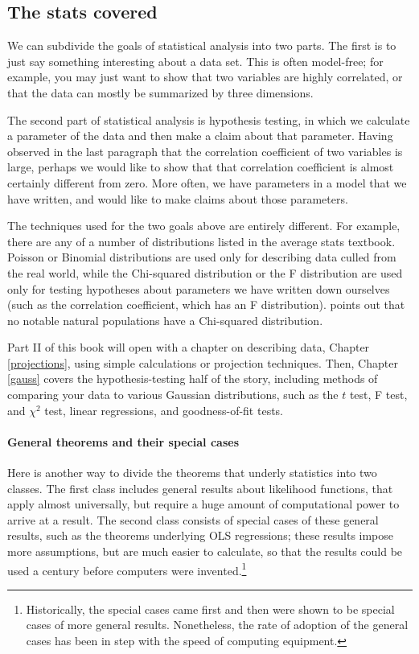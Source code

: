 \begin{multicols}{2}




\section{The stats covered} 
We can subdivide the goals of statistical analysis into two parts. The
first is to just say something interesting about a data set. This is often
model-free; for example, you may just want to show that two variables
are highly correlated, or that the data can mostly be summarized by three
dimensions.

The second part of statistical analysis is hypothesis testing, in which
we calculate a parameter of the data and then make a claim about that
parameter.  Having observed in the last paragraph that the correlation
coefficient of two variables is large, perhaps we would like to show
that that correlation coefficient is almost certainly different from
zero. More often, we have parameters in a model that we have written,
and would like to make claims about those parameters.

The techniques used for the two goals above are entirely different. For
example, there are any of a number of distributions listed in the
average stats textbook.  Poisson or Binomial distributions are used
only for describing data culled from the real world, while the Chi-squared
distribution or the F distribution are used only for testing hypotheses
about parameters we have written down ourselves (such as the correlation
coefficient, which has an F distribution). \citet[p 141]{kmenta} points out
that no notable natural populations have a Chi-squared distribution.

Part II of this book will open with a chapter on describing data,
Chapter \ref{projections}, using simple calculations or projection
techniques. Then, Chapter \ref{gauss} covers the hypothesis-testing
half of the story, including methods of comparing your data to various
Gaussian distributions, such as the $t$ test, F test, and $\chi^2$ test,
linear regressions, and goodness-of-fit tests.



\paragraph{General theorems and their special cases}
Here is another way to divide the theorems that underly
statistics into two classes. The first class includes general
results about likelihood functions, that 
apply almost universally, but require a huge
amount of computational power to arrive at a result. The second class
consists of special cases of these general results, such as the theorems
underlying OLS regressions; these results impose more
assumptions, but are much easier to calculate, so that the results could
be used a century before computers were invented.\footnote{Historically,
the special cases came first and then were shown to be special cases of
more general results. Nonetheless, the rate of adoption of the general
cases has been in step with the speed of computing equipment.}


\end{multicols}
